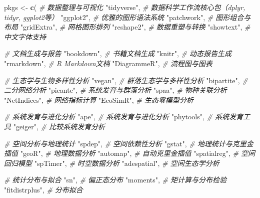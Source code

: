 \documentclass[
  twoside,12pt,fontset=none]{ctexbook}
\newenvironment{Shaded}{\begin{snugshade}}{\end{snugshade}}
\newcommand{\CommentTok}[1]{\textcolor[rgb]{0.56,0.35,0.01}{\textit{#1}}}
\newcommand{\FunctionTok}[1]{\textcolor[rgb]{0.13,0.29,0.53}{\textbf{#1}}}
\newcommand{\NormalTok}[1]{#1}
\newcommand{\OtherTok}[1]{\textcolor[rgb]{0.56,0.35,0.01}{#1}}
\newcommand{\StringTok}[1]{\textcolor[rgb]{0.31,0.60,0.02}{#1}}
\begin{document}
\begin{Shaded}
\begin{Highlighting}[]
\NormalTok{pkgs }\OtherTok{\textless{}{-}} \FunctionTok{c}\NormalTok{(}
  \CommentTok{\# 数据整理与可视化}
  \StringTok{"tidyverse"}\NormalTok{,      }\CommentTok{\# 数据科学工作流核心包（dplyr, tidyr, ggplot2等）}
  \StringTok{"ggplot2"}\NormalTok{,        }\CommentTok{\# 优雅的图形语法系统}
  \StringTok{"patchwork"}\NormalTok{,      }\CommentTok{\# 图形组合与布局}
  \StringTok{"gridExtra"}\NormalTok{,      }\CommentTok{\# 网格图形排列}
  \StringTok{"reshape2"}\NormalTok{,       }\CommentTok{\# 数据重塑与转换}
  \StringTok{"showtext"}\NormalTok{,       }\CommentTok{\# 中文字体支持}

  \CommentTok{\# 文档生成与报告}
  \StringTok{"bookdown"}\NormalTok{,       }\CommentTok{\# 书籍文档生成}
  \StringTok{"knitr"}\NormalTok{,          }\CommentTok{\# 动态报告生成}
  \StringTok{"rmarkdown"}\NormalTok{,      }\CommentTok{\# R Markdown文档}
  \StringTok{"DiagrammeR"}\NormalTok{,     }\CommentTok{\# 流程图与图表}

  \CommentTok{\# 生态学与生物多样性分析}
  \StringTok{"vegan"}\NormalTok{,          }\CommentTok{\# 群落生态学与多样性分析}
  \StringTok{"bipartite"}\NormalTok{,      }\CommentTok{\# 二分网络分析}
  \StringTok{"picante"}\NormalTok{,        }\CommentTok{\# 系统发育与群落分析}
  \StringTok{"spaa"}\NormalTok{,           }\CommentTok{\# 物种关联分析}
  \StringTok{"NetIndices"}\NormalTok{,     }\CommentTok{\# 网络指标计算}
  \StringTok{"EcoSimR"}\NormalTok{,        }\CommentTok{\# 生态零模型分析}

  \CommentTok{\# 系统发育与进化分析}
  \StringTok{"ape"}\NormalTok{,            }\CommentTok{\# 系统发育与进化分析}
  \StringTok{"phytools"}\NormalTok{,       }\CommentTok{\# 系统发育工具}
  \StringTok{"geiger"}\NormalTok{,         }\CommentTok{\# 比较系统发育分析}

  \CommentTok{\# 空间分析与地理统计}
  \StringTok{"spdep"}\NormalTok{,          }\CommentTok{\# 空间依赖性分析}
  \StringTok{"gstat"}\NormalTok{,          }\CommentTok{\# 地理统计与克里金插值}
  \StringTok{"geoR"}\NormalTok{,           }\CommentTok{\# 地理数据分析}
  \StringTok{"automap"}\NormalTok{,        }\CommentTok{\# 自动克里金插值}
  \StringTok{"spatialreg"}\NormalTok{,     }\CommentTok{\# 空间回归模型}
  \StringTok{"spTimer"}\NormalTok{,        }\CommentTok{\# 时空数据分析}
  \StringTok{"adespatial"}\NormalTok{,     }\CommentTok{\# 空间生态学分析}

  \CommentTok{\# 统计分布与拟合}
  \StringTok{"sn"}\NormalTok{,             }\CommentTok{\# 偏正态分布}
  \StringTok{"moments"}\NormalTok{,        }\CommentTok{\# 矩计算与分布检验}
  \StringTok{"fitdistrplus"}\NormalTok{,   }\CommentTok{\# 分布拟合}


\end{Highlighting}
\end{Shaded}
\end{document}
